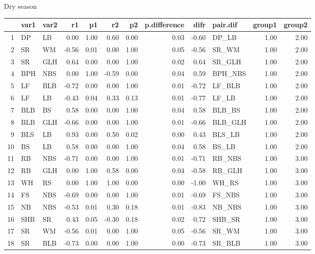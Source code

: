 Dry season 

\begin{table}[ht]
\centering
\begin{tabular}{rllrrrrrrlrr}
  \hline
 & var1 & var2 & r1 & p1 & r2 & p2 & p.difference & difr & pair.dif & group1 & group2 \\ 
  \hline
1 & DP & LB & 0.00 & 1.00 & 0.60 & 0.00 & 0.03 & -0.60 & DP\_LB & 1.00 & 2.00 \\ 
  2 & SR & WM & -0.56 & 0.01 & 0.00 & 1.00 & 0.05 & -0.56 & SR\_WM & 1.00 & 2.00 \\ 
  3 & SR & GLH & 0.64 & 0.00 & 0.00 & 1.00 & 0.02 & 0.64 & SR\_GLH & 1.00 & 2.00 \\ 
  4 & BPH & NBS & 0.00 & 1.00 & -0.59 & 0.00 & 0.04 & 0.59 & BPH\_NBS & 1.00 & 2.00 \\ 
  5 & LF & BLB & -0.72 & 0.00 & 0.00 & 1.00 & 0.01 & -0.72 & LF\_BLB & 1.00 & 2.00 \\ 
  6 & LF & LB & -0.43 & 0.04 & 0.33 & 0.13 & 0.01 & -0.77 & LF\_LB & 1.00 & 2.00 \\ 
  7 & BLB & BS & 0.58 & 0.00 & 0.00 & 1.00 & 0.04 & 0.58 & BLB\_BS & 1.00 & 2.00 \\ 
  8 & BLB & GLH & -0.66 & 0.00 & 0.00 & 1.00 & 0.01 & -0.66 & BLB\_GLH & 1.00 & 2.00 \\ 
  9 & BLS & LB & 0.93 & 0.00 & 0.50 & 0.02 & 0.00 & 0.43 & BLS\_LB & 1.00 & 2.00 \\ 
  10 & BS & LB & 0.58 & 0.00 & 0.00 & 1.00 & 0.04 & 0.58 & BS\_LB & 1.00 & 2.00 \\ 
  11 & RB & NBS & -0.71 & 0.00 & 0.00 & 1.00 & 0.01 & -0.71 & RB\_NBS & 1.00 & 3.00 \\ 
  12 & RB & GLH & 0.00 & 1.00 & 0.58 & 0.00 & 0.04 & -0.58 & RB\_GLH & 1.00 & 3.00 \\ 
  13 & WH & RS & 0.00 & 1.00 & 1.00 & 0.00 & 0.00 & -1.00 & WH\_RS & 1.00 & 3.00 \\ 
  14 & FS & NBS & -0.69 & 0.00 & 0.00 & 1.00 & 0.01 & -0.69 & FS\_NBS & 1.00 & 3.00 \\ 
  15 & NB & NBS & -0.53 & 0.01 & 0.30 & 0.18 & 0.01 & -0.83 & NB\_NBS & 1.00 & 3.00 \\ 
  16 & SHB & SR & 0.43 & 0.05 & -0.30 & 0.18 & 0.02 & 0.72 & SHB\_SR & 1.00 & 3.00 \\ 
  17 & SR & WM & -0.56 & 0.01 & 0.00 & 1.00 & 0.05 & -0.56 & SR\_WM & 1.00 & 3.00 \\ 
  18 & SR & BLB & -0.73 & 0.00 & 0.00 & 1.00 & 0.00 & -0.73 & SR\_BLB & 1.00 & 3.00 \\ 

\end{tabular}
\end{table}
